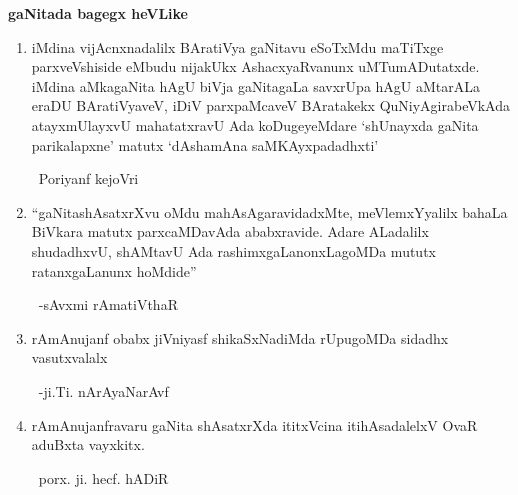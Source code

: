 \begin{center}
{\bf gaNitada bagegx heVLike} 
\end{center}
\begin{enumerate}[\rm 1)]
\item iMdina vijAcnxnadalilx BAratiVya gaNitavu eSoTxMdu maTiTxge parxveVshiside eMbudu nijakUkx AshacxyaRvanunx uMTumADutatxde. iMdina aMkagaNita hAgU biVja gaNitagaLa savxrUpa hAgU aMtarALa eraDU BAratiVyaveV, iDiV parxpaMcaveV BAratakekx QuNiyAgirabeVkAda atayxmUlayxvU mahatatxravU Ada koDugeyeMdare `shUnayxda gaNita parikalapxne' matutx `dAshamAna saMKAyxpadadhxti'

~\hfill Poriyanf kejoVri

\item ``gaNitashAsatxrXvu oMdu mahAsAgaravidadxMte, meVlemxYyalilx bahaLa BiVkara matutx parxcaMDavAda ababxravide. Adare ALadalilx shudadhxvU, shAMtavU Ada rashimxgaLanonxLagoMDa mututx ratanxgaLanunx hoMdide''

~\hfill -sAvxmi rAmatiVthaR

\item rAmAnujanf obabx jiVniyasf shikaSxNadiMda rUpugoMDa sidadhx vasutxvalalx 

~\hfill -ji.Ti. nArAyaNarAvf

\item rAmAnujanfravaru gaNita shAsatxrXda ititxVcina itihAsadalelxV OvaR aduBxta vayxkitx. 

~\hfill porx. ji. hecf. hADiR 
\end{enumerate}
